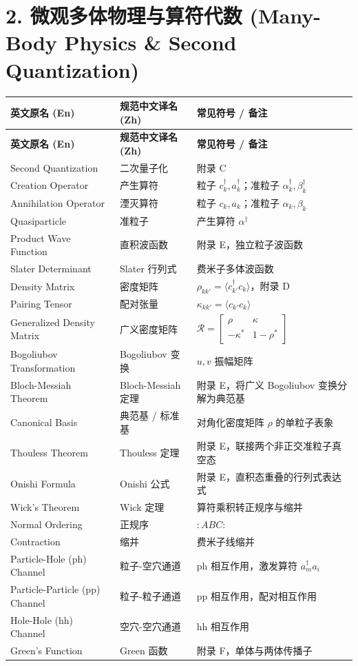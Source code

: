 \section*{2. 微观多体物理与算符代数 (Many-Body Physics \& Second Quantization)}

\begin{longtable}{p{4.8cm} p{4.8cm} p{5.0cm}}
\toprule
\textbf{英文原名 (En)} & \textbf{规范中文译名 (Zh)} & \textbf{常见符号 / 备注} \tabularnewline
\midrule
\endfirsthead
\toprule
\textbf{英文原名 (En)} & \textbf{规范中文译名 (Zh)} & \textbf{常见符号 / 备注} \tabularnewline
\midrule
\endhead
\bottomrule
\endfoot
\bottomrule
\endlastfoot
Second Quantization & 二次量子化 & 附录 C \tabularnewline
Creation Operator & 产生算符 & 粒子 $c_k^\dagger, a_k^\dagger$；准粒子 $\alpha_k^\dagger, \beta_k^\dagger$ \tabularnewline
Annihilation Operator & 湮灭算符 & 粒子 $c_k, a_k$；准粒子 $\alpha_k, \beta_k$ \tabularnewline
Quasiparticle & 准粒子 & 产生算符 $\alpha^\dagger$ \tabularnewline
Product Wave Function & 直积波函数 & 附录 E，独立粒子波函数 \tabularnewline
Slater Determinant & Slater 行列式 & 费米子多体波函数 \tabularnewline
Density Matrix & 密度矩阵 & $\rho_{kk'} = \langle c_{k'}^\dagger c_k \rangle$，附录 D \tabularnewline
Pairing Tensor & 配对张量 & $\kappa_{kk'} = \langle c_{k'} c_k \rangle$ \tabularnewline
Generalized Density Matrix & 广义密度矩阵 & $\mathcal{R} = \begin{bmatrix} \rho & \kappa \\ -\kappa^* & 1-\rho^* \end{bmatrix}$ \tabularnewline
Bogoliubov Transformation & Bogoliubov 变换 & $u, v$ 振幅矩阵 \tabularnewline
Bloch-Messiah Theorem & Bloch-Messiah 定理 & 附录 E，将广义 Bogoliubov 变换分解为典范基 \tabularnewline
Canonical Basis & 典范基 / 标准基 & 对角化密度矩阵 $\rho$ 的单粒子表象 \tabularnewline
Thouless Theorem & Thouless 定理 & 附录 E，联接两个非正交准粒子真空态 \tabularnewline
Onishi Formula & Onishi 公式 & 附录 E，直积态重叠的行列式表达式 \tabularnewline
Wick's Theorem & Wick 定理 & 算符乘积转正规序与缩并 \tabularnewline
Normal Ordering & 正规序 & $: A B C :$ \tabularnewline
Contraction & 缩并 & 费米子线缩并 \tabularnewline
Particle-Hole (ph) Channel & 粒子-空穴通道 & $\text{ph}$ 相互作用，激发算符 $a_m^\dagger a_i$ \tabularnewline
Particle-Particle (pp) Channel & 粒子-粒子通道 & $\text{pp}$ 相互作用，配对相互作用 \tabularnewline
Hole-Hole (hh) Channel & 空穴-空穴通道 & $\text{hh}$ 相互作用 \tabularnewline
Green's Function & Green 函数 & 附录 F，单体与两体传播子 \tabularnewline
\end{longtable}

